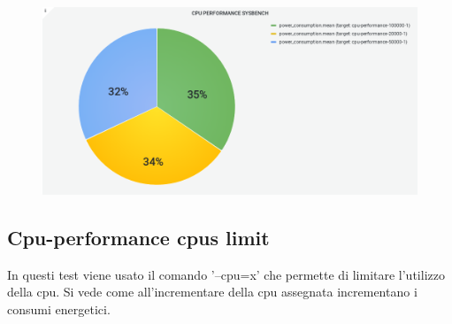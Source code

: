 \documentclass[a4paper, 11pt]{article}
\begin{document}
\begin{itemize}
\begin{figure}[h]
\begin{flushleft}
\includegraphics[scale=0.4]{image39}
\end{flushleft}
\end{figure}
\end{itemize}
\clearpage
\subsection{Cpu-performance cpus limit}
\begin{flushleft}
In questi test viene usato il comando '--cpu=x' che permette di limitare l'utilizzo della cpu.
Si vede come all'incrementare della cpu assegnata incrementano i consumi energetici.
\end{flushleft}
\end{document}
